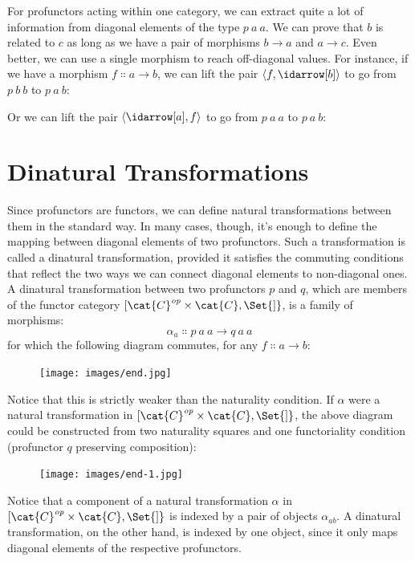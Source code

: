 For profunctors acting within one category, we can extract quite a lot
of information from diagonal elements of the type $p\ a\ a$. We
can prove that $b$ is related to $c$ as long as we have a
pair of morphisms $b \to a$ and
$a \to c$. Even better, we can use a single morphism to
reach off-diagonal values. For instance, if we have a morphism
$f \Colon a \to b$, we can lift the pair
$\langle f, \idarrow[b] \rangle$ to go from $p\ b\ b$ to
$p\ a\ b$:

Or we can lift the pair $\langle \idarrow[a], f \rangle$ to go
from $p\ a\ a$ to $p\ a\ b$:


\section{Dinatural Transformations}

Since profunctors are functors, we can define natural transformations
between them in the standard way. In many cases, though, it's enough to
define the mapping between diagonal elements of two profunctors. Such a
transformation is called a dinatural transformation, provided it
satisfies the commuting conditions that reflect the two ways we can
connect diagonal elements to non-diagonal ones. A dinatural
transformation between two profunctors $p$ and $q$, which
are members of the functor category ${[}\cat{C}^\mathit{op}\times{}\cat{C}, \Set{]}$, is a
family of morphisms:
\[\alpha_a \Colon p\ a\ a \to q\ a\ a\]
for which the following diagram commutes, for any $f \Colon a \to b$:

\begin{figure}[H]
  \centering
  \texttt{[image: images/end.jpg]}
\end{figure}

\noindent
Notice that this is strictly weaker than the naturality condition. If
$\alpha$ were a natural transformation in
${[}\cat{C}^\mathit{op}\times{}\cat{C}, \Set{]}$, the above diagram could be constructed
from two naturality squares and one functoriality condition (profunctor
$q$ preserving composition):

\begin{figure}[H]
  \centering
  \texttt{[image: images/end-1.jpg]}
\end{figure}

\noindent
Notice that a component of a natural transformation $\alpha$ in
${[}\cat{C}^\mathit{op}\times{}\cat{C}, \Set{]}$ is indexed by a pair of objects
$\alpha_{a b}$. A dinatural transformation, on the other hand, is
indexed by one object, since it only maps diagonal elements of the
respective profunctors.

